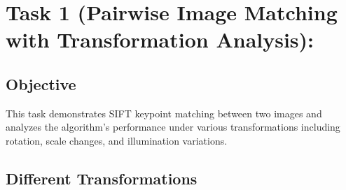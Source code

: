 \documentclass[12pt,a4paper]{article}
\begin{document}
\section{Task 1 (Pairwise Image Matching with Transformation Analysis):}

\subsection{Objective}

This task demonstrates SIFT keypoint matching between two images and analyzes the algorithm's performance under various transformations including rotation, scale changes, and illumination variations.

\subsection{Different Transformations}
\end{document}
